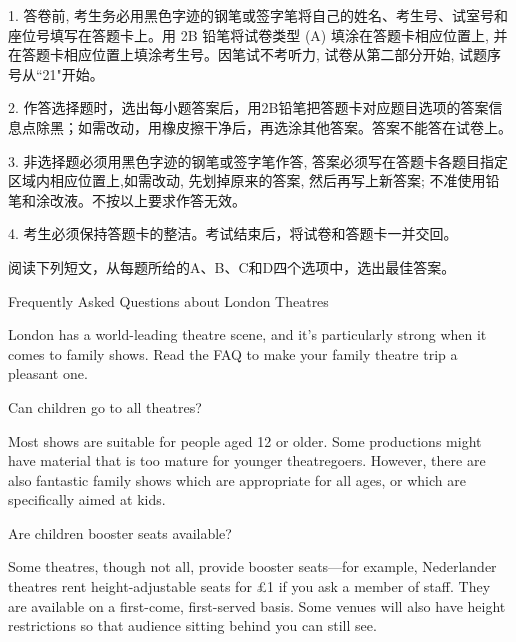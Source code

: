 \documentclass{英语试卷}
\begin{document}
\begin{notice}
\par 1. 答卷前, 考生务必用黑色字迹的钢笔或签字笔将自己的姓名、考生号、试室号和座位号填写在答题卡上。用 2B 铅笔将试卷类型 (A) 填涂在答题卡相应位置上, 并在答题卡相应位置上填涂考生号。因笔试不考听力, 试卷从第二部分开始, 试题序号从“21"开始。\par
\par 2. 作答选择题时，选出每小题答案后，用2B铅笔把答题卡对应题目选项的答案信息点除黑；如需改动，用橡皮擦干净后，再选涂其他答案。答案不能答在试卷上。\par
\par 3. 非选择题必须用黑色字迹的钢笔或签字笔作答, 答案必须写在答题卡各题目指定区域内相应位置上,如需改动, 先划掉原来的答案, 然后再写上新答案; 不准使用铅笔和涂改液。不按以上要求作答无效。\par
\par 4. 考生必须保持答题卡的整洁。考试结束后，将试卷和答题卡一并交回。\par
\end{notice}
\par 阅读下列短文，从每题所给的A、B、C和D四个选项中，选出最佳答案。\par
{}
\par Frequently Asked Questions about London Theatres\par
\par London has a world-leading theatre scene, and it's particularly strong when it comes to family shows. Read the FAQ to make your family theatre trip a pleasant one.\par
\par Can children go to all theatres?\par
\par Most shows are suitable for people aged 12 or older. Some productions might have material that is too mature for younger theatregoers. However, there are also fantastic family shows which are appropriate for all ages, or which are specifically aimed at kids.\par
\par Are children booster seats available?\par
\par Some theatres, though not all, provide booster seats—for example, Nederlander theatres rent height-adjustable seats for £1 if you ask a member of staff. They are available on a first-come, first-served basis. Some venues will also have height restrictions so that audience sitting behind you can still see.\par
\end{document}
